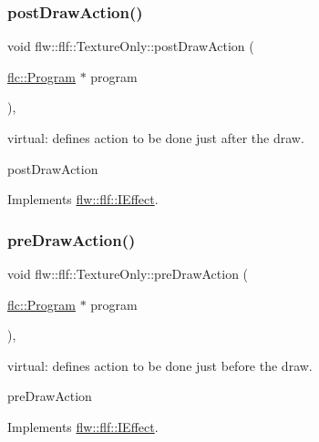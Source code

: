 \subsubsection{\texorpdfstring{post\+Draw\+Action()}{postDrawAction()}}
{\footnotesize\ttfamily void flw\+::flf\+::\+Texture\+Only\+::post\+Draw\+Action (\begin{DoxyParamCaption}\item[{\hyperlink{classflw_1_1flc_1_1Program}{flc\+::\+Program} $\ast$}]{program }\end{DoxyParamCaption})\hspace{0.3cm}{\ttfamily [override]}, {\ttfamily [virtual]}}



virtual\+: defines action to be done just after the draw. 

post\+Draw\+Action 

Implements \hyperlink{classflw_1_1flf_1_1IEffect_a6bb11d90e7e4da057ca398bd8c61208a}{flw\+::flf\+::\+I\+Effect}.

\mbox{\label{classflw_1_1flf_1_1TextureOnly_a58511d525bcd55ff7cf636a08be9afc1}} 
\subsubsection{\texorpdfstring{pre\+Draw\+Action()}{preDrawAction()}}
{\footnotesize\ttfamily void flw\+::flf\+::\+Texture\+Only\+::pre\+Draw\+Action (\begin{DoxyParamCaption}\item[{\hyperlink{classflw_1_1flc_1_1Program}{flc\+::\+Program} $\ast$}]{program }\end{DoxyParamCaption})\hspace{0.3cm}{\ttfamily [override]}, {\ttfamily [virtual]}}



virtual\+: defines action to be done just before the draw. 

pre\+Draw\+Action 

Implements \hyperlink{classflw_1_1flf_1_1IEffect_ae65eed21e40a226c7739d3c5dedd9e50}{flw\+::flf\+::\+I\+Effect}.

\mbox{\label{classflw_1_1flf_1_1TextureOnly_a5a04ae9211a3fb98df63166d3e009a5a}} 
